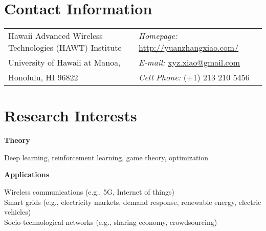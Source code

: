 \documentclass[margin,line]{res}
\newenvironment{list1}{
  \begin{list}{\ding{113}}{%
      \setlength{\itemsep}{0in}
      \setlength{\parsep}{0in} \setlength{\parskip}{0in}
      \setlength{\topsep}{0in} \setlength{\partopsep}{0in}
      \setlength{\leftmargin}{0.17in}}}{\end{list}}
\begin{document}

\begin{resume}



\section{\sc Contact Information}
\vspace{.05in}
\begin{tabular}{@{}p{3.5in}p{4in}}
Hawaii Advanced Wireless Technologies (HAWT) Institute         & {\it Homepage:}  \href{http://yuanzhangxiao.com/}{http://yuanzhangxiao.com/} \\
University of Hawaii at Manoa, & {\it E-mail:}  \href{mailto:xyz.xiao@gmail.com}{xyz.xiao@gmail.com} \\
Honolulu, HI 96822              & {\it Cell Phone:}  (+1) 213 210 5456 \\
\end{tabular}


\section{\sc Research Interests}
\vspace*{.1in}
{\bf Theory}\\
\vspace*{-.1in}
\begin{list1}
\item[] Deep learning, reinforcement learning, game theory, optimization
\end{list1}
\vspace*{-.1in}
{\bf Applications}\\
\vspace*{-.1in}
\begin{list1}
\item[]  Wireless communications (e.g., 5G, Internet of things) \\
Smart grids (e.g., electricity markets, demand response, renewable energy, electric vehicles) \\
Socio-technological networks (e.g., sharing economy, crowdsourcing)
\end{list1}




\end{resume}
\end{document}
